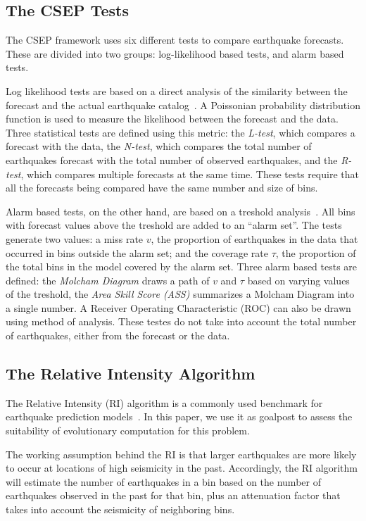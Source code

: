 \documentclass{sig-alternate}
\begin{document}
\subsection{The CSEP Tests} 

The CSEP framework uses six different tests to compare earthquake
forecasts. These are divided into two groups: log-likelihood based
tests, and alarm based tests.

Log likelihood tests are based on a direct analysis of the similarity
between the forecast and the actual earthquake
catalog~\cite{Schorlemmer2007}. A Poissonian probability distribution
function is used to measure the likelihood between the forecast and
the data. Three statistical tests are defined using this metric: the
\emph{L-test}, which compares a forecast with the data, the
\emph{N-test}, which compares the total number of earthquakes forecast
with the total number of observed earthquakes, and the \emph{R-test},
which compares multiple forecasts at the same time. These tests
require that all the forecasts being compared have the same number and
size of bins.

Alarm based tests, on the other hand, are based on a treshold
analysis~\cite{Zechar2010}. All bins with forecast values above the
treshold are added to an ``alarm set''. The tests generate two values:
a miss rate $v$, the proportion of earthquakes in the data that
occurred in bins outside the alarm set; and the coverage rate $\tau$,
the proportion of the total bins in the model covered by the alarm
set. Three alarm based tests are defined: the \emph{Molcham Diagram}
draws a path of $v$ and $\tau$ based on varying values of the
treshold, the \emph{Area Skill Score (ASS)} summarizes a Molcham
Diagram into a single number. A Receiver Operating Characteristic
(ROC) can also be drawn using method of analysis. These testes do not
take into account the total number of earthquakes, either from the
forecast or the data.

\subsection{The Relative Intensity Algorithm}

The Relative Intensity (RI) algorithm is a commonly used benchmark for
earthquake prediction models~\cite{Nanjo2011}. In this paper, we use
it as goalpost to assess the suitability of evolutionary computation
for this problem.

The working assumption behind the RI is that larger earthquakes are
more likely to occur at locations of high seismicity in the
past. Accordingly, the RI algorithm will estimate the number of
earthquakes in a bin based on the number of earthquakes observed in
the past for that bin, plus an attenuation factor that takes into
account the seismicity of neighboring bins.
\end{document}
